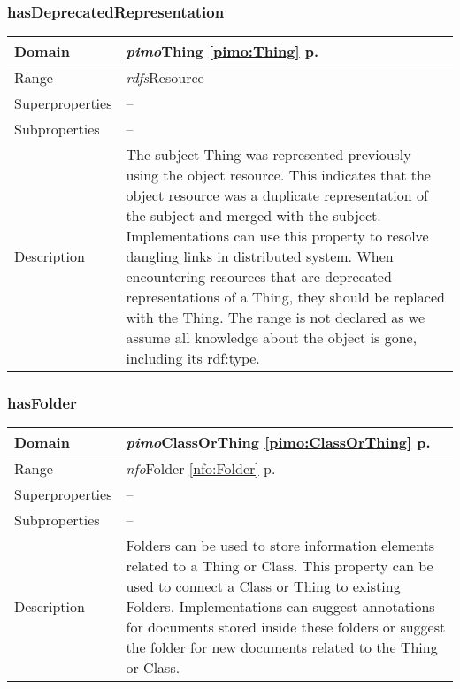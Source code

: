 \subsubsection{hasDeprecatedRepresentation} 
\label{pimo:hasDeprecatedRepresentation}
\begin{longtable}{|p{}|p{}|}
 \hline 
Domain & {\it pimo}\hspace{1pt}Thing \ref{pimo:Thing} p. \pageref{pimo:Thing}\\ \hline 
Range & {\it rdfs}\hspace{1pt}Resource\\ \hline 
Superproperties & --\\ \hline 
Subproperties & --\\ \hline 
Description & The subject Thing was represented previously using the object resource. This indicates that the object resource was a duplicate representation of the subject and merged with the subject. Implementations can use this property to resolve dangling links in distributed system. When encountering resources that are deprecated representations of a Thing, they should be replaced with the Thing. The range is not declared as we assume all knowledge about the object is gone, including its rdf:type.\\ \hline 
\end{longtable}


\subsubsection{hasFolder} 
\label{pimo:hasFolder}
\begin{longtable}{|p{}|p{}|}
 \hline 
Domain & {\it pimo}\hspace{1pt}ClassOrThing \ref{pimo:ClassOrThing} p. \pageref{pimo:ClassOrThing}\\ \hline 
Range & {\it nfo}\hspace{1pt}Folder \ref{nfo:Folder} p. \pageref{nfo:Folder}\\ \hline 
Superproperties & --\\ \hline 
Subproperties & --\\ \hline 
Description & Folders can be used to store information elements related to a Thing or Class. This property can be used to connect a Class or Thing to existing Folders. Implementations can suggest annotations for documents stored inside these folders or  suggest the folder for new documents related to the Thing or Class.\\ \hline 
\end{longtable}


